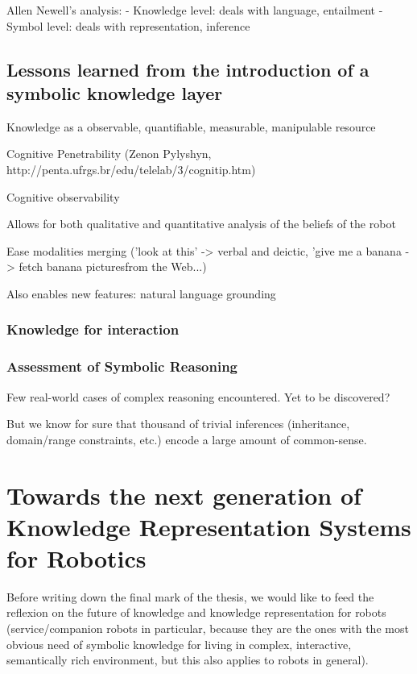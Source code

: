 Allen Newell's analysis:
- Knowledge level: deals with language, entailment
- Symbol level: deals with representation, inference


\subsection{Lessons learned from the introduction of a symbolic knowledge layer}

Knowledge as a observable, quantifiable, measurable, manipulable resource

Cognitive Penetrability (Zenon Pylyshyn, http://penta.ufrgs.br/edu/telelab/3/cognitip.htm)

Cognitive observability

Allows for both qualitative and quantitative analysis of the beliefs of the robot

Ease modalities merging ('look at this' -> verbal and deictic, 'give me a
banana -> fetch banana picturesfrom the Web...)

Also enables new features: natural language grounding


\subsubsection{Knowledge for interaction}

\subsubsection{Assessment of Symbolic Reasoning}

Few real-world cases of complex reasoning encountered. Yet to be discovered?

But we know for sure that thousand of trivial inferences (inheritance,
domain/range constraints, etc.) encode a large amount of common-sense.

\section{Towards the next generation of Knowledge Representation Systems for Robotics}
\label{sect|perspectives}


Before writing down the final mark of the thesis, we would like to feed the
reflexion on the future of knowledge and knowledge representation for robots
(service/companion robots in particular, because they are the ones with the
most obvious need of symbolic knowledge for living in complex, interactive,
semantically rich environment, but this also applies to robots in general).

